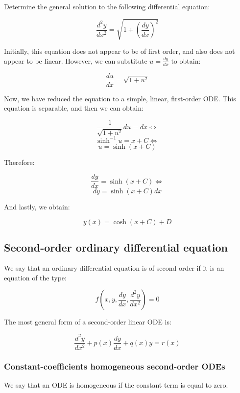 \documentclass[12pt]{article}
\begin{document}
\begin{example}
    Determine the general solution to the following differential equation:

    \[ \frac{d^2y}{dx^2} = \sqrt{1 + \left(\frac{dy}{dx}\right)^2} \]

    Initially, this equation does not appear to be of first order, and also does not appear to be linear. However, we can substitute $u = \frac{dy}{dx}$ to obtain:

    \[ \frac{du}{dx} = \sqrt{1 + u^2} \]

    Now, we have reduced the equation to a simple, linear, first-order ODE. This equation is separable, and then we can obtain:

    \[ \frac{1}{\sqrt{1 + u^2}}du = dx \Leftrightarrow \]
    \[ \sinh^{-1}{u} = x + C \Leftrightarrow \]
    \[ u = \sinh{(x + C)} \]

    Therefore:

    \[ \frac{dy}{dx} = \sinh{(x + C)} \Leftrightarrow \]
    \[ dy = \sinh{(x + C)}dx \]

    And lastly, we obtain:

    \[ y(x) = \cosh{(x + C)} + D \]

    \newpage

    \subsection{Second-order ordinary differential equation}
\end{example}

\begin{definition}
    We say that an ordinary differential equation is of second order if it is an equation of the type:

    \[ f(x, y, \frac{dy}{dx}, \frac{d^2y}{dx^2}) = 0 \]
\end{definition}

The most general form of a second-order linear ODE is:

\[ \frac{d^2y}{dx^2} + p(x)\frac{dy}{dx} + q(x)y = r(x) \]

\subsubsection{Constant-coefficients homogeneous second-order ODEs}

\begin{definition}[Homogeneity]
    We say that an ODE is homogeneous if the constant term is equal to zero.
\end{definition}
\end{document}

